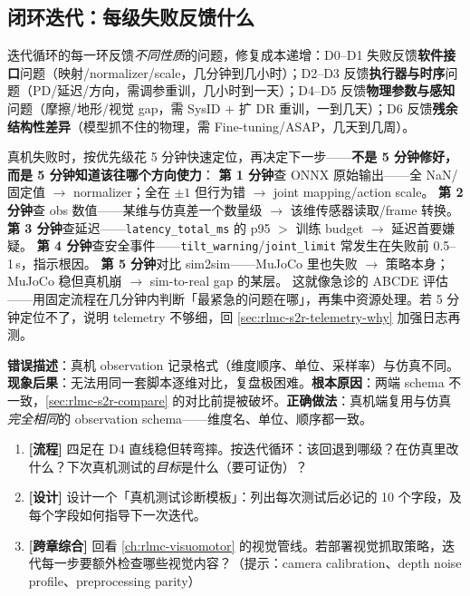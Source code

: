 \subsection{闭环迭代：每级失败反馈什么}
\label{sec:rlmc-s2r-loop}

迭代循环的每一环反馈\emph{不同性质}的问题，修复成本递增：D0--D1 失败反馈\textbf{软件接口}问题（映射/normalizer/scale，几分钟到几小时）；D2--D3 反馈\textbf{执行器与时序}问题（PD/延迟/方向，需调参重训，几小时到一天）；D4--D5 反馈\textbf{物理参数与感知}问题（摩擦/地形/视觉 gap，需 SysID $+$ 扩 DR 重训，一到几天）；D6 反馈\textbf{残余结构性差异}（模型抓不住的物理，需 Fine-tuning/ASAP，几天到几周）。

\begin{insight}\label{ins:rlmc-s2r-fivemin}
真机失败时，按优先级花 5 分钟快速定位，再决定下一步——\textbf{不是 5 分钟修好，而是 5 分钟知道该往哪个方向使力}：
\textbf{第 1 分钟}查 ONNX 原始输出——全 NaN/固定值 $\to$ normalizer；全在 $\pm1$ 但行为错 $\to$ joint mapping/action scale。
\textbf{第 2 分钟}查 obs 数值——某维与仿真差一个数量级 $\to$ 该维传感器读取/frame 转换。
\textbf{第 3 分钟}查延迟——\verb|latency_total_ms| 的 p95 $>$ 训练 budget $\to$ 延迟首要嫌疑。
\textbf{第 4 分钟}查安全事件——\verb|tilt_warning|/\verb|joint_limit| 常发生在失败前 0.5--1\,s，指示根因。
\textbf{第 5 分钟}对比 sim2sim——MuJoCo 里也失败 $\to$ 策略本身；MuJoCo 稳但真机崩 $\to$ sim-to-real gap 的某层。
这就像急诊的 ABCDE 评估——用固定流程在几分钟内判断「最紧急的问题在哪」，再集中资源处理。若 5 分钟定位不了，说明 telemetry 不够细，回 \cref{sec:rlmc-s2r-telemetry-why} 加强日志再测。
\end{insight}

\begin{pitfall}[真机日志格式与仿真日志不兼容]
\textbf{错误描述}：真机 observation 记录格式（维度顺序、单位、采样率）与仿真不同。\textbf{现象后果}：无法用同一套脚本逐维对比，复盘极困难。\textbf{根本原因}：两端 schema 不一致，\cref{sec:rlmc-s2r-compare} 的对比前提被破坏。\textbf{正确做法}：真机端复用与仿真\emph{完全相同}的 observation schema——维度名、单位、顺序都一致。
\end{pitfall}

\begin{practice}
\begin{enumerate}
  \item \textbf{[流程]} 四足在 D4 直线稳但转弯摔。按迭代循环：该回退到哪级？在仿真里改什么？下次真机测试的\emph{目标}是什么（要可证伪）？
  \item \textbf{[设计]} 设计一个「真机测试诊断模板」：列出每次测试后必记的 10 个字段，及每个字段如何指导下一次迭代。
  \item \textbf{[跨章综合]} 回看 \cref{ch:rlmc-visuomotor} 的视觉管线。若部署视觉抓取策略，迭代每一步要额外检查哪些视觉内容？（提示：camera calibration、depth noise profile、preprocessing parity）
\end{enumerate}
\end{practice}

